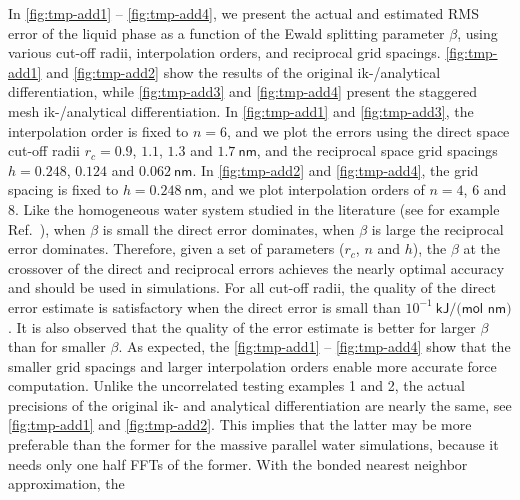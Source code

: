 \documentclass[journal=jacsat,manuscript=article]{achemso}
\newcommand{\recheck}[1]{{\color{black} #1}}
\begin{document}
\recheck{
In \ref{fig:tmp-add1} -- \ref{fig:tmp-add4}, we present the 
actual and estimated RMS error of the liquid phase as a function of
the Ewald splitting parameter $\beta$, using various cut-off radii,
interpolation orders, and reciprocal grid spacings.
\ref{fig:tmp-add1} and \ref{fig:tmp-add2} show the results of the
original ik-/analytical differentiation,
while \ref{fig:tmp-add3} and \ref{fig:tmp-add4} present
the staggered mesh ik-/analytical differentiation.
In
\ref{fig:tmp-add1} and \ref{fig:tmp-add3},
the interpolation order is fixed to $n=6$,
and we plot the errors using the direct space
cut-off radii $r_c = 0.9$, $1.1$, $1.3$ and $1.7\:\textsf{nm}$, and
the reciprocal space grid spacings $h = 0.248$, $0.124$ and
$0.062\:\textsf{nm}$. In \ref{fig:tmp-add2} and \ref{fig:tmp-add4}, the 
grid spacing is fixed to $h = 0.248\:\textsf{nm}$, and
we plot interpolation orders of $n=4$, 6 and 8.
Like the
homogeneous water system studied in the literature (see for
example Ref.~\cite{wang2010optimizing, ballenegger2012convert}),
when $\beta$ is small the direct error dominates, when  $\beta$ is
large the reciprocal error dominates.
Therefore, given a set of parameters ($r_c$, $n$ and $h$),
the $\beta$ at the crossover of the direct and reciprocal errors
achieves the nearly optimal accuracy and should be used in simulations.
For all cut-off radii,
the quality of the direct error estimate is satisfactory when the
direct error is small than $10^{-1}\:\textsf{kJ/(mol nm)}$.
It is also observed that the quality of the error estimate is better
for larger $\beta$ than for smaller $\beta$.
As expected, the \ref{fig:tmp-add1} -- \ref{fig:tmp-add4} show that
the smaller grid spacings and larger interpolation orders
enable more accurate force computation. 
Unlike the uncorrelated testing examples 1 and 2, the actual precisions of the 
original ik- and analytical differentiation are nearly the same,
see \ref{fig:tmp-add1} and \ref{fig:tmp-add2}.
This implies that the latter may be more preferable than
the former for the massive parallel water simulations,
because it needs only one half FFTs of the former.
With the bonded nearest neighbor approximation, the
}
\end{document}
